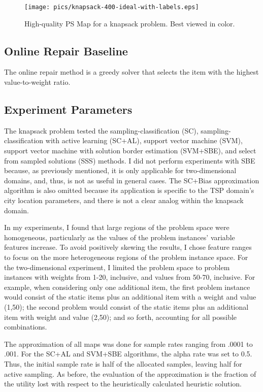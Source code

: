 \begin{figure}
\begin{center}
\texttt{[image: pics/knapsack-400-ideal-with-labels.eps]}
\caption{High-quality PS Map for a knapsack problem.  Best viewed in color.}
\label{fig:knapsack-ideal}
\end{center}
\end{figure}

\subsection{Online Repair Baseline}  The online repair method is a greedy solver that selects the item with the highest value-to-weight ratio.


\subsection{Experiment Parameters}

The knapsack problem tested the sampling-classification (SC), sampling-classification with active learning (SC+AL), support vector machine (SVM), support vector machine with solution border estimation (SVM+SBE), and select from sampled solutions (SSS) methods.  I did not perform experiments with SBE because, as previously mentioned, it is only applicable for two-dimensional domains, and, thus, is not as useful in general cases.  The SC+Bias approximation algorithm is also omitted because its application is specific to the TSP domain's city location parameters, and there is not a clear analog within the knapsack domain.

In my experiments, I found that large regions of the problem space were homogeneous, particularly as the values of the problem instances' variable features increase.  To avoid positively skewing the results, I chose feature ranges to focus on the more heterogeneous regions of the problem instance space.  For the two-dimensional experiment, I limited the problem space to problem instances with  weights from  1-20, inclusive, and values from 50-70, inclusive.  For example, when considering only one additional item, the first problem instance would consist of the static items plus an additional item with a weight and value (1,50); the second problem would consist of the static items plus an additional item with weight and value (2,50); and so forth, accounting for all possible combinations.

The approximation of all maps was done for  sample rates ranging from .0001 to .001.  For the SC+AL and SVM+SBE algorithms, the alpha rate was set to 0.5.  Thus, the initial sample rate is half of the allocated samples, leaving half for active sampling.  As before, the evaluation of the approximation is the fraction of the utility lost with respect to the heuristically calculated heuristic solution.


